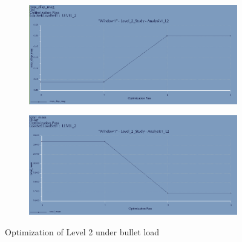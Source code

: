 \documentclass[12pt,letterpaper]{report}
\begin{document}
		\begin{figure}[H]
			\centering
			\begin{subfigure}{.45\textwidth}
				\includegraphics[width=\textwidth]{L2BulletOptimDispGraph}
				\label{fig:L2BulletOptimDispGraph}
			\end{subfigure}
			\begin{subfigure}{.45\textwidth}
				\includegraphics[width=\textwidth]{L2BulletOptimMassGraph}
				\label{fig:L2BulletOptimMassGraph}
			\end{subfigure}
			\caption{Optimization of Level 2 under bullet load}
		\end{figure}
		\graphicspath{ {..} }
		
		\newpage
\end{document}
